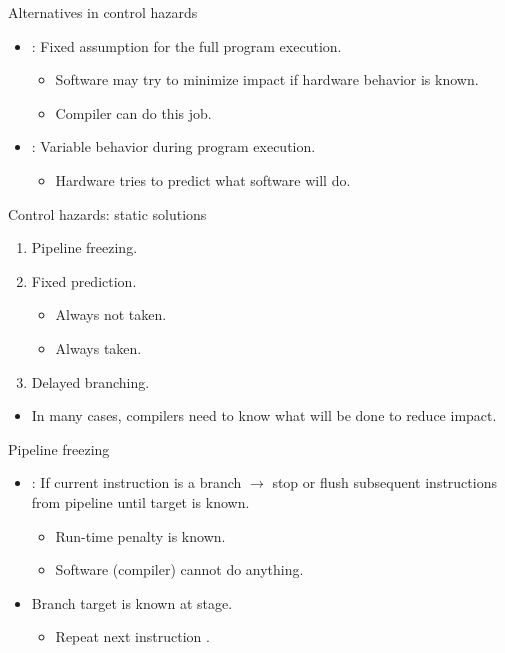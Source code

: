 \begin{frame}[t]{Alternatives in control hazards}
\begin{itemize}
  \item {}: Fixed assumption for the full program execution.
    \begin{itemize}
      \item Software may try to minimize impact if hardware behavior is known.
      \item Compiler can do this job.
    \end{itemize}

  \item {}: Variable behavior during program execution.
    \begin{itemize}
      \item Hardware tries to predict what software will do.
    \end{itemize}
\end{itemize}
\end{frame}

\begin{frame}[t]{Control hazards: static solutions}
\begin{enumerate}
  \item Pipeline freezing.
  \item Fixed prediction.
    \begin{itemize}
      \item Always not taken.
      \item Always taken.
    \end{itemize}
  \item Delayed branching.
\end{enumerate}

\begin{itemize}
  \item In many cases, compilers need to know what will be done to reduce impact.
\end{itemize}
\end{frame}

\begin{frame}[t]{Pipeline freezing}
\begin{itemize}
  \item {}: If current instruction is a branch
        $\rightarrow$ 
        stop or flush subsequent instructions from pipeline
        until target is known.
    \begin{itemize}
      \item Run-time penalty is known.
      \item Software (compiler) cannot do anything.
    \end{itemize}

    \item Branch target is known at  stage.
      \begin{itemize}
        \item Repeat next instruction .
      \end{itemize}
\end{itemize}
\end{frame}

